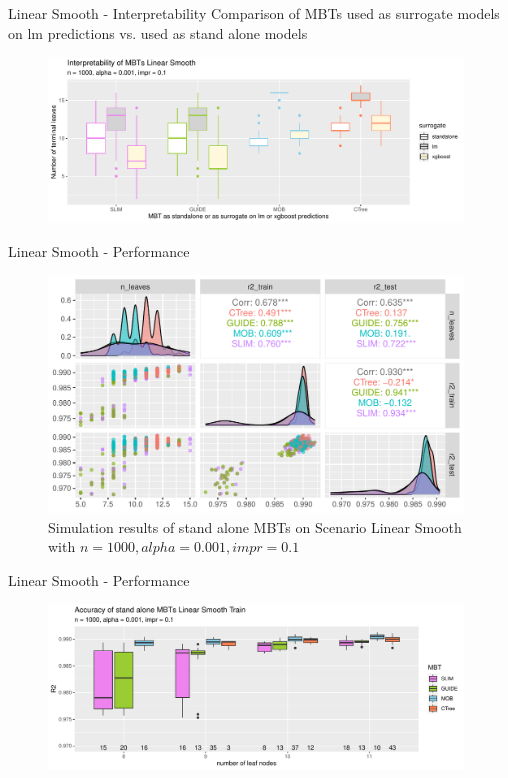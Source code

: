 \documentclass[9pt, xcolor=table]{beamer}
\begin{document}
\begin{frame}{Linear Smooth - Interpretability}
Comparison of MBTs used as surrogate models on lm predictions vs. used as stand alone models 
\begin{figure}
    \includegraphics[width=11cm]{Figures/simulations/batchtools/basic_scenarios/linear_smooth/ls_1000_int.pdf}
\end{figure}  
\end{frame}


\begin{frame}{Linear Smooth - Performance}
\begin{figure}
\caption{Simulation results of stand alone MBTs on Scenario Linear Smooth with $n = 1000, alpha = 0.001, impr = 0.1$}
    \includegraphics[width=11cm]{Figures/simulations/batchtools/basic_scenarios/linear_smooth/ls_1000_standalone_r2_nleaves.pdf}
\end{figure}   

    
\end{frame}

\begin{frame}{Linear Smooth - Performance}
\begin{figure}
    \includegraphics[width=11cm]{Figures/simulations/batchtools/basic_scenarios/linear_smooth/ls_1000_standalone_r2_train.pdf}
\end{figure}  
    
\end{frame}
\end{document}
